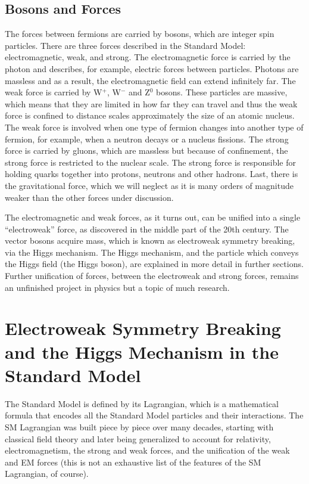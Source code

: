 \subsection{Bosons and Forces}

The forces between fermions are carried by bosons, which are integer spin particles.  There are three forces described in the Standard Model: electromagnetic, weak, and strong.  The electromagnetic force is carried by the photon and describes, for example, electric forces between particles.  Photons are massless and as a result, the electromagnetic field can extend infinitely far.  The weak force is carried by W$^+$, W$^-$ and Z$^0$ bosons.  These particles are massive, which means that they are limited in how far they can travel and thus the weak force is confined to distance scales approximately the size of an atomic nucleus.  The weak force is involved when one type of fermion changes into another type of fermion, for example, when a neutron decays or a nucleus fissions.  The strong force is carried by gluons, which are massless but because of confinement, the strong force is restricted to the nuclear scale.  The strong force is responsible for holding quarks together into protons, neutrons and other hadrons. Last, there is the gravitational force, which we will neglect as it is many orders of magnitude weaker than the other forces under discussion.

The electromagnetic and weak forces, as it turns out, can be unified into a single ``electroweak'' force, as discovered in the middle part of the 20th century.  The vector bosons acquire mass, which is known as electroweak symmetry breaking, via the Higgs mechanism.  The Higgs mechanism, and the particle which conveys the Higgs field (the Higgs boson), are explained in more detail in further sections.  Further unification of forces, between the electroweak and strong forces, remains an unfinished project in physics but a topic of much research.  

\section{Electroweak Symmetry Breaking and the Higgs Mechanism in the Standard Model}
The Standard Model is defined by its Lagrangian, which is a mathematical formula that encodes all the Standard Model particles and their interactions.  The SM Lagrangian was built piece by piece over many decades, starting with classical field theory and later being generalized to account for relativity, electromagnetism, the strong and weak forces, and the unification of the weak and EM forces (this is not an exhaustive list of the features of the SM Lagrangian, of course).  

